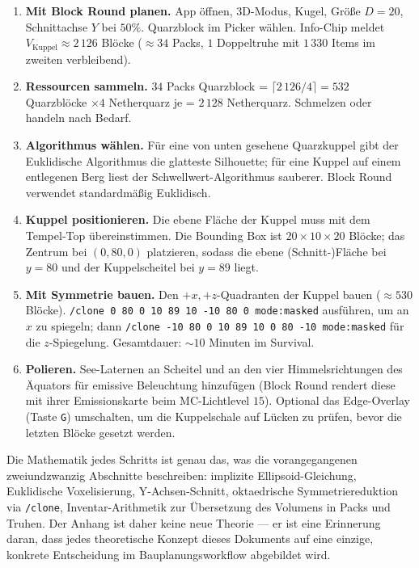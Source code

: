 \documentclass[12pt,a4paper]{scrartcl}
\newcommand{\code}[1]{\texttt{\small #1}}
\newcommand{\cmd}[1]{\textcolor{earth}{\texttt{\small #1}}}
\begin{document}
\begin{enumerate}[leftmargin=1.6em,itemsep=0.3em,topsep=0.3em]
  \item \textbf{Mit Block Round planen.} App öffnen, 3D-Modus, Kugel, Größe $D=20$, Schnittachse $Y$ bei $50\%$. Quarzblock im Picker wählen. Info-Chip meldet $V_{\mathrm{Kuppel}} \approx 2\,126$ Blöcke ($\approx 34$ Packs, $1$ Doppeltruhe mit $1\,330$ Items im zweiten verbleibend).
  \item \textbf{Ressourcen sammeln.} $34$ Packs Quarzblock = $\lceil 2\,126/4 \rceil = 532$ Quarzblöcke $\times 4$ Netherquarz je = $2\,128$ Netherquarz. Schmelzen oder handeln nach Bedarf.
  \item \textbf{Algorithmus wählen.} Für eine von unten gesehene Quarzkuppel gibt der Euklidische Algorithmus die glatteste Silhouette; für eine Kuppel auf einem entlegenen Berg liest der Schwellwert-Algorithmus sauberer. Block Round verwendet standardmäßig Euklidisch.
  \item \textbf{Kuppel positionieren.} Die ebene Fläche der Kuppel muss mit dem Tempel-Top übereinstimmen. Die Bounding Box ist $20 \times 10 \times 20$ Blöcke; das Zentrum bei $(0,80,0)$ platzieren, sodass die ebene (Schnitt-)Fläche bei $y=80$ und der Kuppelscheitel bei $y=89$ liegt.
  \item \textbf{Mit Symmetrie bauen.} Den $+x, +z$-Quadranten der Kuppel bauen ($\approx 530$ Blöcke). \cmd{/clone 0 80 0 10 89 10 -10 80 0 mode:masked} ausführen, um an $x$ zu spiegeln; dann \cmd{/clone -10 80 0 10 89 10 0 80 -10 mode:masked} für die $z$-Spiegelung. Gesamtdauer: $\sim 10$ Minuten im Survival.
  \item \textbf{Polieren.} See-Laternen an Scheitel und an den vier Himmelsrichtungen des Äquators für emissive Beleuchtung hinzufügen (Block Round rendert diese mit ihrer Emissionskarte beim MC-Lichtlevel $15$). Optional das Edge-Overlay (Taste \code{G}) umschalten, um die Kuppelschale auf Lücken zu prüfen, bevor die letzten Blöcke gesetzt werden.
\end{enumerate}

Die Mathematik jedes Schritts ist genau das, was die vorangegangenen zweiundzwanzig Abschnitte beschreiben: implizite Ellipsoid-Gleichung, Euklidische Voxelisierung, Y-Achsen-Schnitt, oktaedrische Symmetriereduktion via \cmd{/clone}, Inventar-Arithmetik zur Übersetzung des Volumens in Packs und Truhen. Der Anhang ist daher keine neue Theorie --- er ist eine Erinnerung daran, dass jedes theoretische Konzept dieses Dokuments auf eine einzige, konkrete Entscheidung im Bauplanungsworkflow abgebildet wird.
\end{document}

